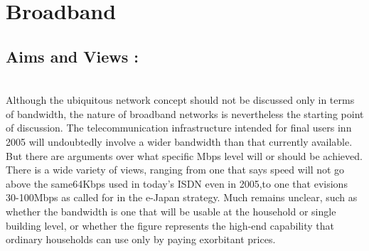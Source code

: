 \documentclass[12pt]{report}
\begin{document}
\section{Broadband}
\subsection{Aims and Views :}\\
\hspace*{0.5in}Although the ubiquitous network concept should not be discussed only in terms of bandwidth, the nature of broadband networks is nevertheless the starting point of discussion. The telecommunication infrastructure intended for final users inn 2005 will undoubtedly involve a wider bandwidth than that currently available. But there are arguments over what specific Mbps level will or should be achieved. There is a wide variety of views, ranging from one that says speed will not go above the same64Kbps used in today's ISDN even in 2005,to one that evisions 30-100Mbps as called for in the e-Japan strategy. Much remains unclear, such as whether the bandwidth is one that will be usable at the household or single building level, or whether the figure represents the high-end capability that ordinary households can use only by paying exorbitant prices.\\
\end{document}
